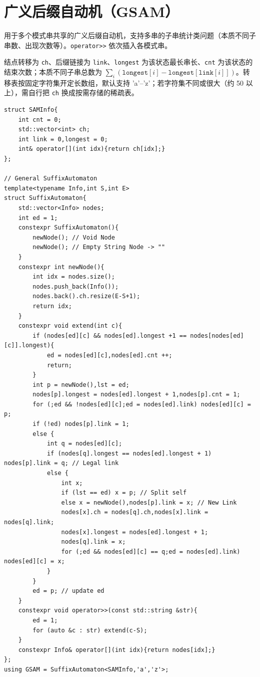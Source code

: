 \section{广义后缀自动机（GSAM）}

用于多个模式串共享的广义后缀自动机，支持多串的子串统计类问题（本质不同子串数、出现次数等）。\texttt{operator>>} 依次插入各模式串。

结点转移为 \texttt{ch}、后缀链接为 \texttt{link}、\texttt{longest} 为该状态最长串长、\texttt{cnt} 为该状态的结束次数；本质不同子串总数为 $\sum_i(\texttt{longest}[i]-\texttt{longest}[\texttt{link}[i]])$。转移表按固定字符集开定长数组，默认支持 'a'–'z'；若字符集不同或很大（约 50 以上），需自行把 \texttt{ch} 换成按需存储的稀疏表。

\begin{lstlisting}
struct SAMInfo{
    int cnt = 0;
    std::vector<int> ch;
    int link = 0,longest = 0;
    int& operator[](int idx){return ch[idx];}
};

// General SuffixAutomaton
template<typename Info,int S,int E>
struct SuffixAutomaton{
    std::vector<Info> nodes;
    int ed = 1;
    constexpr SuffixAutomaton(){
        newNode(); // Void Node
        newNode(); // Empty String Node -> ""
    }
    constexpr int newNode(){
        int idx = nodes.size();
        nodes.push_back(Info());
        nodes.back().ch.resize(E-S+1);
        return idx;
    }
    constexpr void extend(int c){
        if (nodes[ed][c] && nodes[ed].longest +1 == nodes[nodes[ed][c]].longest){
            ed = nodes[ed][c],nodes[ed].cnt ++;
            return;
        }
        int p = newNode(),lst = ed;
        nodes[p].longest = nodes[ed].longest + 1,nodes[p].cnt = 1;
        for (;ed && !nodes[ed][c];ed = nodes[ed].link) nodes[ed][c] = p;
        if (!ed) nodes[p].link = 1;
        else {
            int q = nodes[ed][c];
            if (nodes[q].longest == nodes[ed].longest + 1) nodes[p].link = q; // Legal link
            else {
                int x;
                if (lst == ed) x = p; // Split self
                else x = newNode(),nodes[p].link = x; // New Link
                nodes[x].ch = nodes[q].ch,nodes[x].link = nodes[q].link;
                nodes[x].longest = nodes[ed].longest + 1;
                nodes[q].link = x;
                for (;ed && nodes[ed][c] == q;ed = nodes[ed].link) nodes[ed][c] = x;
            }
        }
        ed = p; // update ed
    }
    constexpr void operator>>(const std::string &str){
        ed = 1;
        for (auto &c : str) extend(c-S);
    }
    constexpr Info& operator[](int idx){return nodes[idx];}
};
using GSAM = SuffixAutomaton<SAMInfo,'a','z'>;
\end{lstlisting}

